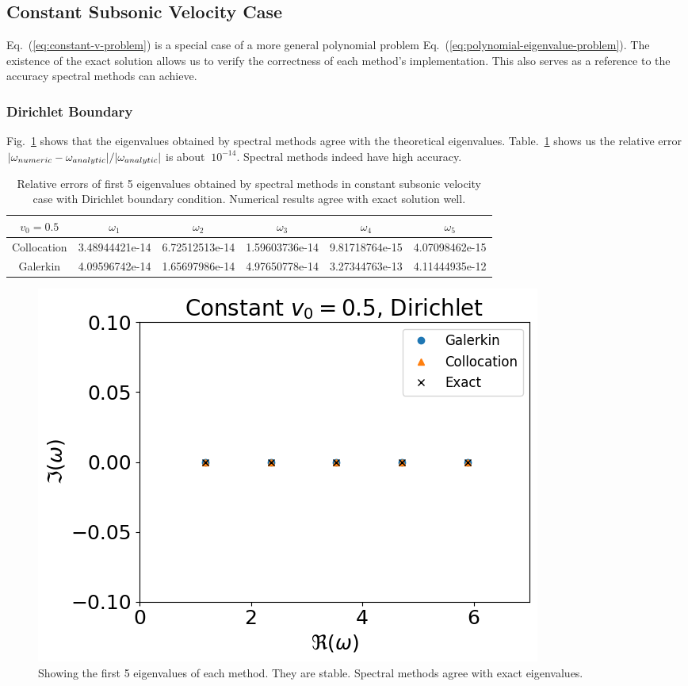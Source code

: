 \subsection{Constant Subsonic Velocity Case}
Eq.~(\ref{eq:constant-v-problem}) is a special case of a more general polynomial problem Eq.~(\ref{eq:polynomial-eigenvalue-problem}). The existence of the exact solution allows us to verify the correctness of each method's implementation. This also serves as a reference to the accuracy spectral methods can achieve.

\subsubsection*{Dirichlet Boundary}
Fig.~\ref{fig:constant-subsonic-dirichlet} shows that the eigenvalues obtained by spectral methods agree with the theoretical eigenvalues. Table.~\ref{table:eigenvalue-error-constant-subsonic-dirichlet} shows us the relative error $\abs{\omega_{numeric} - \omega_{analytic}}/\abs{\omega_{analytic}}$ is about $~10^{-14}$. Spectral methods indeed have high accuracy.

\begin{table} [H]
	\centering
	\caption{Relative errors of first 5 eigenvalues obtained by spectral methods in constant subsonic velocity case with Dirichlet boundary condition. Numerical results agree with exact solution well.}
	\begin{tabular}{|c|c|c|c|c|c|}
		\hline
		$v_0=0.5$   & $\omega_1$     & $\omega_2$     & $\omega_3$     & $\omega_4$     & $\omega_5$     \\
		\hline
		Collocation & 3.48944421e-14 & 6.72512513e-14 & 1.59603736e-14 & 9.81718764e-15 & 4.07098462e-15 \\
		\hline
		Galerkin    & 4.09596742e-14 & 1.65697986e-14 & 4.97650778e-14 & 3.27344763e-13 & 4.11444935e-12 \\
		\hline
	\end{tabular}
	\label{table:eigenvalue-error-constant-subsonic-dirichlet}
\end{table}

\begin{figure}[H]
	\centering
	\includegraphics[width=0.7\linewidth]{figures/constant-subsonic-dirichlet.png}
	\caption{Showing the first 5 eigenvalues of each method. They are stable. Spectral methods agree with exact eigenvalues.}
	\label{fig:constant-subsonic-dirichlet}
\end{figure}


